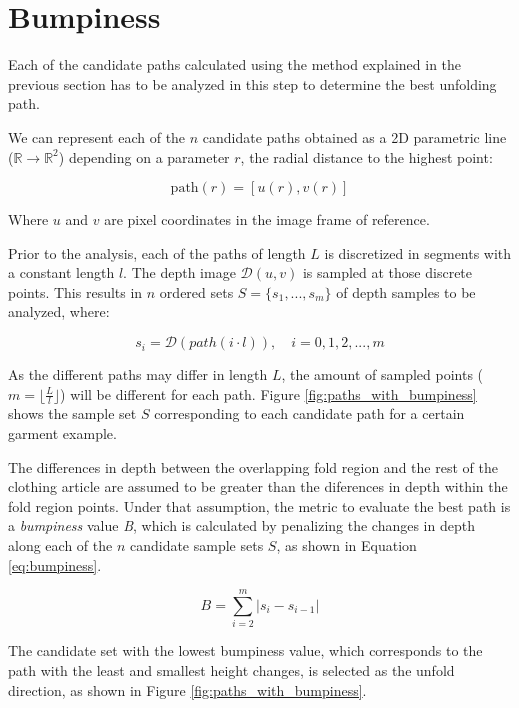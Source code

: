 \section{Bumpiness}
\label{bumpiness}
Each of the candidate paths calculated using the method explained in the previous section has to be analyzed in this step to determine the best unfolding path. 

We can represent each of the $n$ candidate paths obtained as a 2D parametric line ($\mathbb{R} \to \mathbb{R}^2$) depending on a parameter $r$, the radial distance to the highest point:

\begin{equation}
\textrm{path}(r) = \left[u(r), v(r)\right]
\end{equation}

Where $u$ and $v$ are pixel coordinates in the image frame of reference.

Prior to the analysis, each of the paths of length $L$ is discretized in segments with a constant length $l$. The depth image $\mathcal{D}(u,v)$ is sampled at those discrete points. This results in $n$ ordered sets $S=\{ s_1,...,s_m\}$ of depth samples to be analyzed, where:


\begin{equation}
s_i = \mathcal{D}(path(i \cdot l)), \quad  i=0,1,2,..., m
\end{equation}

As the different paths may differ in length $L$, the amount of sampled points ($m=${\Large$\lfloor\frac{L}{l}\rfloor$}) will be different for each path. Figure \ref{fig:paths_with_bumpiness} shows the sample set $S$ corresponding to each candidate path for a certain garment example.

The differences in depth between the overlapping fold region and the rest of the clothing article are assumed to be greater than the diferences in depth within the fold region points. Under that assumption, the metric to evaluate the best path is a \textit{bumpiness} value \textit{B}, which is calculated by penalizing the changes in depth along each of the $n$ candidate sample sets $S$, as shown in Equation \ref{eq:bumpiness}.

\begin{equation}\label{eq:bumpiness}
B = \sum_{i=2}^{m} | s_i- s_{i-1} | 
\end{equation}

The candidate set with the lowest bumpiness value, which corresponds to the path with the least and smallest height changes, is selected as the unfold direction, as shown in Figure \ref{fig:paths_with_bumpiness}.

